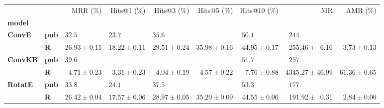 \begin{tabular}{llrrrrrrr}
\toprule
       &   &                    MRR (\%) &                 Hits@1 (\%) &                 Hits@3 (\%) &                 Hits@5 (\%) &                Hits@10 (\%) &                                       MR &                    AMR (\%) \\
\textbf{model} & {} &                             &                             &                             &                             &                             &                                          &                             \\
\midrule
\textbf{ConvE} & \textbf{pub} &  $32.5\phantom{0 \pm 0.00}$ &  $23.7\phantom{0 \pm 0.00}$ &  $35.6\phantom{0 \pm 0.00}$ &                             &  $50.1\phantom{0 \pm 0.00}$ &  $\phantom{0}244.\phantom{00 \pm 00.00}$ &                             \\
       & \textbf{R} &            $26.93 \pm 0.11$ &            $18.22 \pm 0.11$ &            $29.51 \pm 0.24$ &            $35.98 \pm 0.16$ &            $44.95 \pm 0.17$ &  $\phantom{0}255.46 \pm \phantom{0}6.16$ &  $\phantom{0}3.73 \pm 0.13$ \\\midrule
\textbf{ConvKB} & \textbf{pub} &  $39.6\phantom{0 \pm 0.00}$ &                             &                             &                             &  $51.7\phantom{0 \pm 0.00}$ &  $\phantom{0}257.\phantom{00 \pm 00.00}$ &                             \\
       & \textbf{R} &  $\phantom{0}4.71 \pm 0.23$ &  $\phantom{0}3.31 \pm 0.23$ &  $\phantom{0}4.04 \pm 0.19$ &  $\phantom{0}4.57 \pm 0.22$ &  $\phantom{0}7.76 \pm 0.88$ &                      $4345.27 \pm 46.99$ &            $61.36 \pm 0.65$ \\\midrule
\textbf{RotatE} & \textbf{pub} &  $33.8\phantom{0 \pm 0.00}$ &  $24.1\phantom{0 \pm 0.00}$ &  $37.5\phantom{0 \pm 0.00}$ &                             &  $53.3\phantom{0 \pm 0.00}$ &  $\phantom{0}177.\phantom{00 \pm 00.00}$ &                             \\
       & \textbf{R} &            $26.42 \pm 0.04$ &            $17.57 \pm 0.06$ &            $28.97 \pm 0.05$ &            $35.29 \pm 0.09$ &            $44.55 \pm 0.06$ &  $\phantom{0}191.92 \pm \phantom{0}0.31$ &  $\phantom{0}2.84 \pm 0.00$ \\
\bottomrule
\end{tabular}

